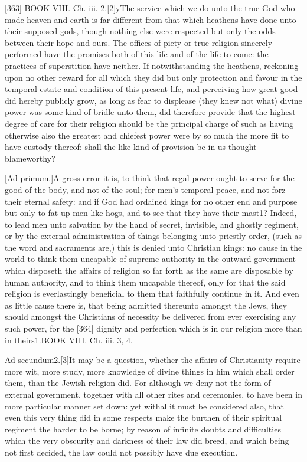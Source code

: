 [363]
BOOK VIII. Ch. iii. 2.[2]yThe service which we do unto the true God who made heaven and earth is far different from that which heathens have done unto their supposed gods, though nothing else were respected but only the odds between their hope and ours. The offices of piety or true religion sincerely performed have the promises both of this life and of the life to come: the practices of superstition have neither. If notwithstanding the heathens, reckoning upon no other reward for all which they did but only protection and favour in the temporal estate and condition of this present life, and perceiving how great good did hereby publicly grow, as long as fear to displease (they knew not what) divine power was some kind of bridle unto them, did therefore provide that the highest degree of care for their religion should be the principal charge of such as having otherwise also the greatest and chiefest power were by so much the more fit to have custody thereof: shall the like kind of provision be in us thought blameworthy?

[Ad primum.]A gross error it is, to think that regal power ought to serve for the good of the body, and not of the soul; for men’s temporal peace, and not forz their eternal safety: and if God had ordained kings for no other end and purpose but only to fat up men like hogs, and to see that they have their mast1? Indeed, to lead men unto salvation by the hand of secret, invisible, and ghostly regiment, or by the external administration of things belonging unto priestly order, (such as the word and sacraments are,) this is denied unto Christian kings: no cause in the world to think them uncapable of supreme authority in the outward government which disposeth the affairs of religion so far forth as the same are disposable by human authority, and to think them uncapable thereof, only for that the said religion is everlastingly beneficial to them that faithfully continue in it. And even as little cause there is, that being admitted thereunto amongst the Jews, they should amongst the Christians of necessity be delivered from ever exercising any such power, for the [364] dignity and perfection which is in our religion more than in theirs1.BOOK VIII. Ch. iii. 3, 4.

Ad secundum2.[3]It may be a question, whether the affairs of Christianity require more wit, more study, more knowledge of divine things in him which shall order them, than the Jewish religion did. For although we deny not the form of external government, together with all other rites and ceremonies, to have been in more particular manner set down: yet withal it must be considered also, that even this very thing did in some respects make the burthen of their spiritual regiment the harder to be borne; by reason of infinite doubts and difficulties which the very obscurity and darkness of their law did breed, and which being not first decided, the law could not possibly have due execution.

